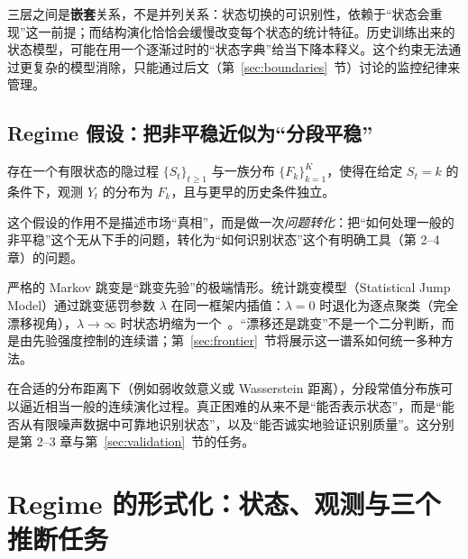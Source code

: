 三层之间是\textbf{嵌套}关系，不是并列关系：状态切换的可识别性，依赖于“状态会重现”这一前提；而结构演化恰恰会缓慢改变每个状态的统计特征。历史训练出来的状态模型，可能在用一个逐渐过时的“状态字典”给当下降本释义。这个约束无法通过更复杂的模型消除，只能通过后文（第~\ref{sec:boundaries}~节）讨论的监控纪律来管理。

\subsection{Regime 假设：把非平稳近似为“分段平稳”}

\begin{definition}[分段平稳假设]
存在一个有限状态的隐过程 $\{S_t\}_{t\ge 1}$ 与一族分布 $\{F_k\}_{k=1}^{K}$，使得在给定 $S_t = k$ 的条件下，观测 $Y_t$ 的分布为 $F_k$，且与更早的历史条件独立。
\end{definition}

这个假设的作用不是描述市场“真相”，而是做一次\emph{问题转化}：把“如何处理一般的非平稳”这个无从下手的问题，转化为“如何识别状态”这个有明确工具（第 2--4 章）的问题。

\begin{remark}[跳变—漂移是一个连续谱]
严格的 Markov 跳变是“跳变先验”的极端情形。统计跳变模型（Statistical Jump Model）通过跳变惩罚参数 $\lambda$ 在同一框架内插值：$\lambda = 0$ 时退化为逐点聚类（完全漂移视角），$\lambda \to \infty$ 时状态坍缩为一个~\cite{shu2024a}。“漂移还是跳变”不是一个二分判断，而是由先验强度控制的连续谱；第~\ref{sec:frontier}~节将展示这一谱系如何统一多种方法。
\end{remark}

\begin{remark}[表达能力通常不是限制]
在合适的分布距离下（例如弱收敛意义或 Wasserstein 距离），分段常值分布族可以逼近相当一般的连续演化过程。真正困难的从来不是“能否表示状态”，而是“能否从有限噪声数据中可靠地识别状态”，以及“能否诚实地验证识别质量”。这分别是第 2--3 章与第~\ref{sec:validation}~节的任务。
\end{remark}



\section{Regime 的形式化：状态、观测与三个推断任务}

